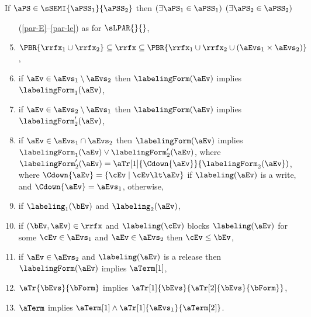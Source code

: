 \begin{definition}
  If $\aPS \in \sSEMI{\aPSS_1}{\aPSS_2}$ then
  $(\exists\aPS_1\in\aPSS_1)$ $(\exists\aPS_2\in\aPSS_2)$
  \begin{enumerate}[topsep=0pt]
    \setcounter{enumi}{3}
  \item[(\ref{par-E}--\ref{par-le})] as for $\sLPAR{}{}$,
  \item \label{seq-rf1}
    $\PBR{{\rrfx_1}\cup{\rrfx_2}}\subseteq{\rrfx}\subseteq\PBR{{\rrfx_1}\cup{\rrfx_2}\cup(\aEvs_1\times \aEvs_2)}$, 
  \item \label{seq-kappa1}
    if $\aEv\in\aEvs_1\setminus\aEvs_2$ then $\labelingForm(\aEv)$ implies $\labelingForm_1(\aEv)$,
  \item \label{seq-kappa2}
    if $\aEv\in\aEvs_2\setminus\aEvs_1$ then $\labelingForm(\aEv)$ implies $\labelingForm'_2(\aEv)$,
  \item \label{seq-kappa12}
    if $\aEv\in\aEvs_1\cap\aEvs_2$ then $\labelingForm(\aEv)$ implies $\labelingForm_1(\aEv)\lor\labelingForm'_2(\aEv)$,
    where
    $\labelingForm'_2(\aEv)=\aTr[1]{\Cdown{\aEv}}{\labelingForm_2(\aEv})$,\\
    where $\Cdown{\aEv}=\{ \cEv \mid \cEv \lt \aEv \}$ if $\labeling(\aEv)$ is a write,
    and $\Cdown{\aEv}=\aEvs_1$, otherwise,
  \item \label{seq-reorder}
    if %
    $\labeling_1(\bEv)$ and $\labeling_2(\aEv)$,
  \item \label{seq-rf2}
    if $(\bEv,\aEv)\in{\rrfx}$
    and $\labeling(\cEv)$ blocks $\labeling(\aEv)$
    for some $\cEv\in\aEvs_1$ and $\aEv\in\aEvs_2$
    then  $\cEv\le\bEv$,
  \item \label{seq-release}
    if $\aEv\in\aEvs_2$ and $\labeling(\aEv)$ is a release then $\labelingForm(\aEv)$ implies $\aTerm[1]$,
  \item \label{seq-tau}
    $\aTr{\bEvs}{\bForm}$ implies $\aTr[1]{\bEvs}{\aTr[2]{\bEvs}{\bForm}}$,
  \item \label{seq-term}
    $\aTerm$ implies $\aTerm[1]\land\aTr[1]{\aEvs_1}{\aTerm[2]}$.
  \end{enumerate}
  \medskip


\end{definition}
